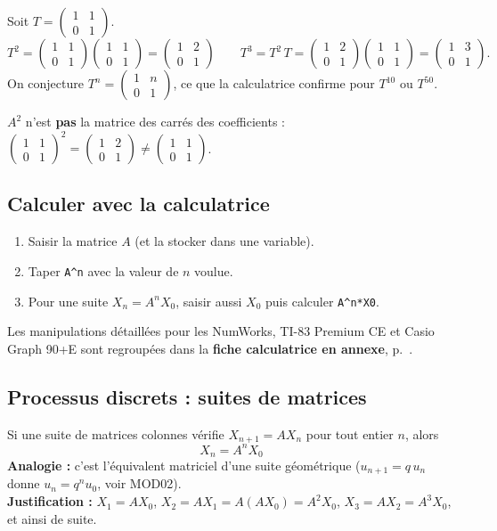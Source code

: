 \documentclass[a4paper,11pt]{article}
\newcommand{\M}[1]{\begin{pmatrix}#1\end{pmatrix}}
\begin{document}
\begin{exemple}\label{ex:puissance}
Soit $T = \M{1 & 1\\ 0 & 1}$.
\[
T^2 = \M{1 & 1\\ 0 & 1}\M{1 & 1\\ 0 & 1} = \M{1 & 2\\ 0 & 1}
\qquad
T^3 = T^2\,T = \M{1 & 2\\ 0 & 1}\M{1 & 1\\ 0 & 1} = \M{1 & 3\\ 0 & 1}.
\]
On conjecture $T^n = \M{1 & n\\ 0 & 1}$, ce que la calculatrice confirme pour $T^{10}$ ou $T^{50}$.
\end{exemple}

\begin{attention}
$A^2$ n'est \textbf{pas} la matrice des carrés des coefficients : $\M{1 & 1\\ 0 & 1}^2 = \M{1 & 2\\ 0 & 1}\neq\M{1 & 1\\ 0 & 1}$.
\end{attention}

\subsection{Calculer avec la calculatrice}\label{subsec:calculatrice}

\begin{methode}
\begin{enumerate}
  \item Saisir la matrice $A$ (et la stocker dans une variable).
  \item Taper \texttt{A\^{}n} avec la valeur de $n$ voulue.
  \item Pour une suite $X_n = A^nX_0$, saisir aussi $X_0$ puis calculer \texttt{A\^{}n*X0}.
\end{enumerate}
Les manipulations détaillées pour les NumWorks, TI-83 Premium CE et Casio Graph 90+E sont regroupées dans la \textbf{fiche calculatrice en annexe}, p.~\pageref{fiche:calc}.
\end{methode}

\subsection{Processus discrets : suites de matrices}\label{subsec:processus}

\begin{theoreme}[-- Suite définie par $X_{n+1} = AX_n$]
Si une suite de matrices colonnes vérifie $X_{n+1} = AX_n$ pour tout entier $n$, alors
\[
\boxed{X_n = A^n X_0}
\]
\textbf{Analogie :} c'est l'équivalent matriciel d'une suite géométrique ($u_{n+1}=q\,u_n$ donne $u_n=q^n u_0$, voir MOD02).\\
\textbf{Justification :} $X_1 = AX_0$, $X_2 = AX_1 = A(AX_0) = A^2X_0$, $X_3 = AX_2 = A^3X_0$, et ainsi de suite.
\end{theoreme}
\end{document}
